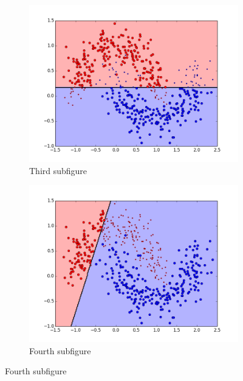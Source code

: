 \begin{figure}[t!]
\medskip
\begin{subfigure}{0.48\textwidth}
\includegraphics[width=\linewidth]{figs/Banana/22All-Classifiers}
\caption{Third subfigure} \label{fig:Banana_all_single_c}
\end{subfigure}\hspace*{\fill}
\begin{subfigure}{0.48\textwidth}
\includegraphics[width=\linewidth]{figs/Banana/54All-Classifiers}
\caption{Fourth subfigure} \label{fig:Banana_all_single_d}
\end{subfigure}


\end{figure}
